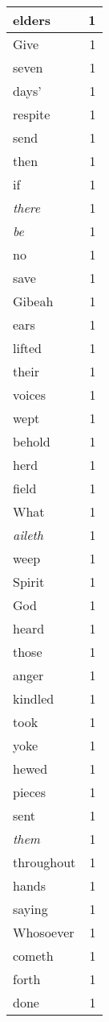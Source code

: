 \begin{center}
\begin{longtable}{l|r}
elders & 1 \\ \hline
Give & 1 \\ \hline
seven & 1 \\ \hline
days' & 1 \\ \hline
respite & 1 \\ \hline
send & 1 \\ \hline
then & 1 \\ \hline
if & 1 \\ \hline
\emph{there} & 1 \\ \hline
\emph{be} & 1 \\ \hline
no & 1 \\ \hline
save & 1 \\ \hline
Gibeah & 1 \\ \hline
ears & 1 \\ \hline
lifted & 1 \\ \hline
their & 1 \\ \hline
voices & 1 \\ \hline
wept & 1 \\ \hline
behold & 1 \\ \hline
herd & 1 \\ \hline
field & 1 \\ \hline
What & 1 \\ \hline
\emph{aileth} & 1 \\ \hline
weep & 1 \\ \hline
Spirit & 1 \\ \hline
God & 1 \\ \hline
heard & 1 \\ \hline
those & 1 \\ \hline
anger & 1 \\ \hline
kindled & 1 \\ \hline
took & 1 \\ \hline
yoke & 1 \\ \hline
hewed & 1 \\ \hline
pieces & 1 \\ \hline
sent & 1 \\ \hline
\emph{them} & 1 \\ \hline
throughout & 1 \\ \hline
hands & 1 \\ \hline
saying & 1 \\ \hline
Whosoever & 1 \\ \hline
cometh & 1 \\ \hline
forth & 1 \\ \hline
done & 1 \\ \hline

\end{longtable}
\end{center}
